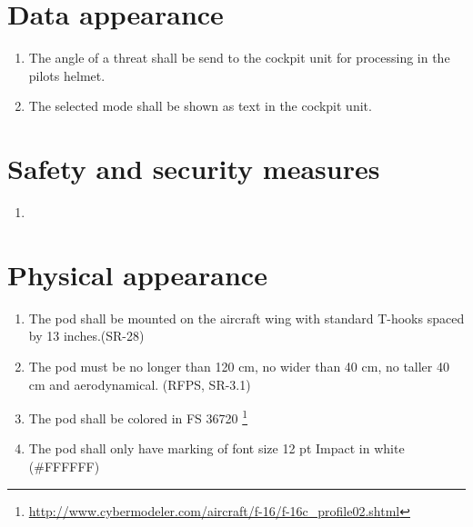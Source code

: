 \documentclass[Main]{subfiles}
\begin{document}
\section{Data appearance}

\begin{enumerate}[resume*]

\item The angle of a threat shall be send to the cockpit unit for processing in the pilots helmet.

\item The selected mode shall be shown as text in the cockpit unit.

\end{enumerate}

\section{Safety and security measures}

\begin{enumerate}[resume*]

\item 

\end{enumerate}

\section{Physical appearance}
\begin{enumerate}[resume*]

\item The pod shall be mounted on the aircraft wing with standard T-hooks spaced by 13 inches.(SR-28)

\item The pod must be no longer than 120 cm, no wider than 40 cm, no taller 40 cm and aerodynamical. (RFPS, SR-3.1)

\item The pod shall be colored in FS 36720 \footnote{\url{http://www.cybermodeler.com/aircraft/f-16/f-16c_profile02.shtml}}

\item The pod shall only have marking of font size 12 pt Impact in white (\#FFFFFF)

\end{enumerate}
\end{document}

